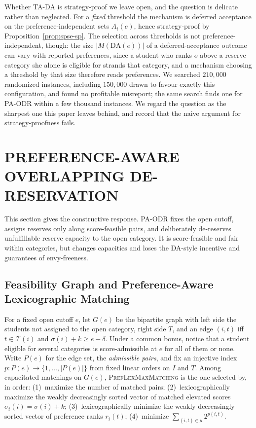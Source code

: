 \documentclass[a4paper,twoside]{article}
\theoremstyle{definition}
\renewcommand{\T}{\mathcal{T}}
\begin{document}
Whether TA-DA is strategy-proof we leave open, and the question is delicate rather than neglected. For a \emph{fixed} threshold the mechanism is deferred acceptance on the preference-independent sets $A_i(e)$, hence strategy-proof by Proposition~\ref{prop:spse-sp}. The selection across thresholds is not preference-independent, though: the size $|M(\mathrm{DA}(e))|$ of a deferred-acceptance outcome can vary with reported preferences, since a student who ranks $o$ above a reserve category she alone is eligible for strands that category, and a mechanism choosing a threshold by that size therefore reads preferences. We searched $210{,}000$ randomized instances, including $150{,}000$ drawn to favour exactly this configuration, and found no profitable misreport; the same search finds one for PA-ODR within a few thousand instances. We regard the question as the sharpest one this paper leaves behind, and record that the naive argument for strategy-proofness fails.

\section{\uppercase{Preference-Aware Overlapping De-Reservation}}
\label{sec:paodr}


This section gives the constructive response. PA-ODR fixes the open cutoff, assigns reserves only along score-feasible pairs, and deliberately de-reserves unfulfillable reserve capacity to the open category. It is score-feasible and fair within categories, but changes capacities and loses the DA-style incentive and guarantees of envy-freeness.

\subsection{Feasibility Graph and Preference-Aware Lexicographic Matching}

For a fixed open cutoff $e$, let $G(e)$ be the bipartite graph with left side the students not assigned to the open category, right side $T$, and an edge $(i,t)$ iff $t\in\T(i)$ and $\sigma(i)+k\ge e-\delta$. Under a common bonus, notice that a student eligible for several categories is score-admissible at $e$ for all of them or none. Write $P(e)$ for the edge set, the \emph{admissible pairs}, and fix an injective index $p:P(e)\to\{1,\dots,|P(e)|\}$ from fixed linear orders on $I$ and $T$. Among capacitated matchings on $G(e)$, \textsc{PrefLexMaxMatching} is the one selected by, in order: (1)~maximize the number of matched pairs; (2)~lexicographically maximize the weakly decreasingly sorted vector of matched elevated scores $\sigma_t(i)=\sigma(i)+k$; (3)~lexicographically minimize the weakly decreasingly sorted vector of preference ranks $r_i(t)$; (4)~minimize $\sum_{(i,t)\in\mu}2^{p(i,t)}$.
\end{document}
